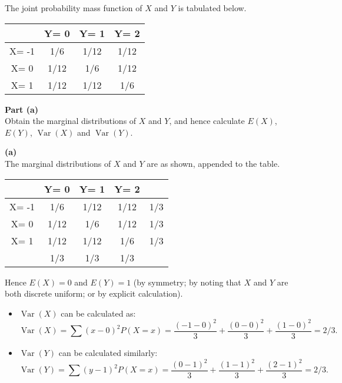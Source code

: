 \documentclass[a4paper,12pt]{article}
\begin{document}
	
	
	\large 
	\noindent The joint probability mass function of $X$ and $Y$ is tabulated below.
	\begin{center}
		\begin{tabular}{|c|c|c|c|}\hline 
			& Y= 0    & Y= 1    & Y= 2        \\ \hline \hline 
			X= -1 & 1/6  & 1/12 & 1/12  \\ \hline 
			X=  0 & 1/12 & 1/6  & 1/12  \\ \hline 
			X=  1 & 1/12 & 1/12 & 1/6  \\ \hline 
			
		\end{tabular}
	\end{center}
	
	\begin{framed}
		\noindent \textbf{Part (a)}\\ Obtain the marginal distributions of $X$ and $Y$, and hence calculate $E(X)$, $E(Y)$,
		$\operatorname{Var}(X)$ and $\operatorname{Var}(Y)$.
	\end{framed}
	\noindent \textbf{(a)}\\
	\large
	The marginal distributions of $X$ and $Y$ are as shown, appended to the table.
	\begin{center}
		\begin{tabular}{|c|c|c|c||c|}\hline 
			& Y= 0    & Y= 1    & Y= 2    &    \\ \hline \hline 
			X= -1 & 1/6  & 1/12 & 1/12 & 1/3 \\ \hline 
			X=  0 & 1/12 & 1/6  & 1/12 & 1/3 \\ \hline 
			X=  1 & 1/12 & 1/12 & 1/6  & 1/3 \\ \hline \hline 
			& 1/3 & 1/3 & 1/3 & \\\hline 
		\end{tabular}
	\end{center}
	\medskip
	Hence $E(X) = 0$ and $E(Y) = 1$ (by symmetry; by noting that $X$ and $Y$ are both discrete
	uniform; or by explicit calculation).
	\begin{itemize}
		\item $\operatorname{Var}(X)$ can be calculated as:
		\[\operatorname{Var}(X) = \sum(x - 0)^2P(X = x) = \frac{{(-1-0)^2}}{3} + \frac{{(0-0)^2}}{3} + \frac{{(1-0)^2}}{3} = 2/3.\]
		
		\item $\operatorname{Var}(Y)$ can be calculated similarly:
		\[\operatorname{Var}(Y) = \sum(y - 1)^2P(X = x) = \frac{{(0-1)^2}}{3} + \frac{{(1-1)^2}}{3} + \frac{{(2-1)^2}}{3} = 2/3.\]
	\end{itemize}
	
\end{document}
